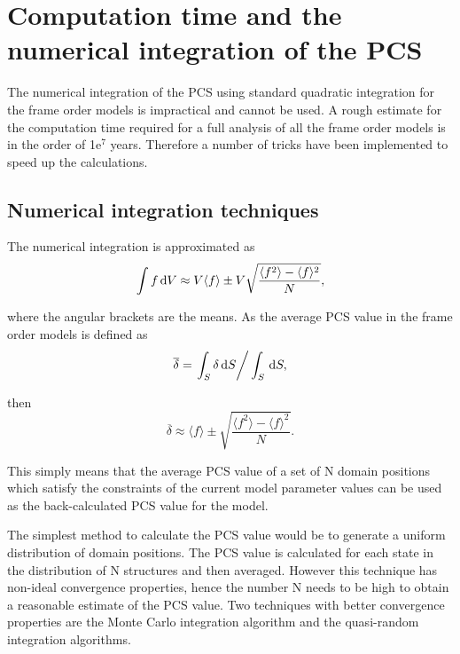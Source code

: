 
\section{Computation time and the numerical integration of the PCS}

The numerical integration of the PCS using standard quadratic integration for the frame order models is impractical and cannot be used.
A rough estimate for the computation time required for a full analysis of all the frame order models is in the order of 1e$^7$ years.
Therefore a number of tricks have been implemented to speed up the calculations.




\subsection{Numerical integration techniques}

The numerical integration is approximated as
\begin{equation}
    \int f \,\mathrm{d} V \approx V \langle f \rangle \pm V \sqrt{\frac{\langle f^2 \rangle - \langle f \rangle^2}{N}} ,
\end{equation}

where the angular brackets are the means.
As the average PCS value in the frame order models is defined as
\begin{equation}
    \overline\delta = \left. \int_S \delta \,\mathrm{d} S \right / \int_S \,\mathrm{d} S ,
\end{equation}

then
\begin{equation}
    \overline\delta \approx \langle f \rangle \pm \sqrt{\frac{\langle f^2 \rangle - \langle f \rangle^2}{N}} .
\end{equation}

This simply means that the average PCS value of a set of N domain positions which satisfy the constraints of the current model parameter values can be used as the back-calculated PCS value for the model.

The simplest method to calculate the PCS value would be to generate a uniform distribution of domain positions.
The PCS value is calculated for each state in the distribution of N structures and then averaged.
However this technique has non-ideal convergence properties, hence the number N needs to be high to obtain a reasonable estimate of the PCS value.
Two techniques with better convergence properties are the Monte Carlo integration algorithm and the quasi-random integration algorithms.



